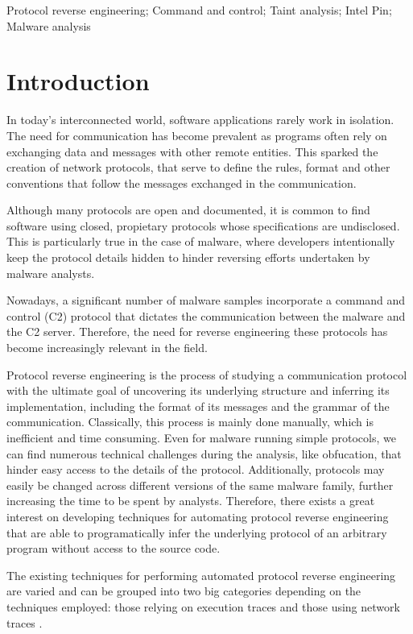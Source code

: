 \documentclass[conference]{IEEEtran}
\begin{document}
\begin{IEEEkeywords}
    Protocol reverse engineering; Command and control; Taint analysis; Intel Pin; Malware analysis 
\end{IEEEkeywords}

\section{Introduction}
In today's interconnected world, software applications rarely work in
isolation. The need for communication has become prevalent as programs often
rely on exchanging data and messages with other remote entities. This sparked
the creation of network protocols, that serve to define the rules, format and
other conventions that follow the messages exchanged in the communication.

Although many protocols are open and documented, it is common to find software
using closed, propietary protocols whose specifications are undisclosed. This
is particularly true in the case of malware, where developers intentionally
keep the protocol details hidden to hinder reversing efforts undertaken by
malware analysts.

Nowadays, a significant number of malware samples incorporate a command and
control (C2) protocol that dictates the communication between the malware and
the C2 server. Therefore, the need for reverse engineering these protocols has
become increasingly relevant in the field.

Protocol reverse engineering is the process of studying a communication
protocol with the ultimate goal of uncovering its underlying structure and
inferring its implementation, including the format of its messages and the
grammar of the communication. Classically, this process is mainly done
manually, which is inefficient and time consuming. Even for malware running
simple protocols, we can find numerous technical challenges during the
analysis, like obfucation, that hinder easy access to the details of the
protocol. Additionally, protocols may easily be changed across different
versions of the same malware family, further increasing the time to be spent by
analysts. Therefore, there exists a great interest on developing techniques for
automating protocol reverse engineering that are able to programatically infer
the underlying protocol of an arbitrary program without access to the source
code.

The existing techniques for performing automated protocol reverse engineering
are varied and can be grouped into two big categories depending on the
techniques employed: those relying on execution traces and those using network
traces \cite{sota_apre}\cite{sota_apre2}.
\end{document}
